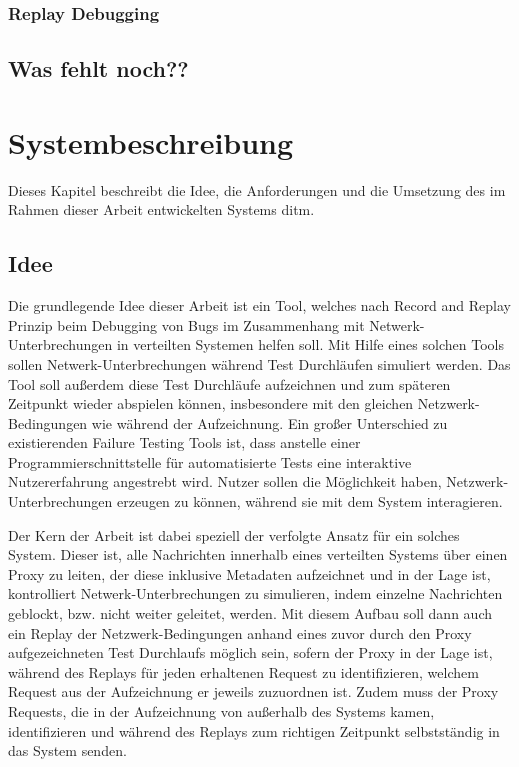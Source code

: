 \documentclass[12pt,a4paper]{report}
\begin{document}
\subsection{Replay Debugging}
\cite{distributed_replay_debugging_1997}
\cite{failify_masters_thesis}

\section{Was fehlt noch??}

\chapter{Systembeschreibung}
Dieses Kapitel beschreibt die Idee, die Anforderungen und die Umsetzung des im Rahmen dieser Arbeit entwickelten Systems ditm.
\section{Idee}
Die grundlegende Idee dieser Arbeit ist ein Tool, welches nach Record and Replay Prinzip beim Debugging von Bugs im Zusammenhang
mit Netwerk-Unterbrechungen in verteilten Systemen helfen soll. Mit Hilfe eines solchen Tools sollen Netwerk-Unterbrechungen
während Test Durchläufen simuliert werden. Das Tool soll außerdem diese Test Durchläufe aufzeichnen und zum späteren Zeitpunkt
wieder abspielen können, insbesondere mit den gleichen Netzwerk-Bedingungen wie während der Aufzeichnung. Ein großer Unterschied
zu existierenden Failure Testing Tools ist, dass anstelle einer Programmierschnittstelle für automatisierte Tests eine interaktive
Nutzererfahrung angestrebt wird. Nutzer sollen die Möglichkeit haben, Netzwerk-Unterbrechungen erzeugen zu können, während sie mit
dem System interagieren.

Der Kern der Arbeit ist dabei speziell der verfolgte Ansatz für ein solches System. Dieser ist, alle Nachrichten innerhalb eines
verteilten Systems über einen Proxy zu leiten, der diese inklusive Metadaten aufzeichnet und in der Lage ist, kontrolliert
Netwerk-Unterbrechungen zu simulieren, indem einzelne Nachrichten geblockt, bzw. nicht weiter geleitet, werden.
Mit diesem Aufbau soll dann auch ein Replay der Netzwerk-Bedingungen anhand eines zuvor durch den Proxy aufgezeichneten
Test Durchlaufs möglich sein, sofern der Proxy in der Lage ist, während des Replays für jeden erhaltenen Request zu identifizieren,
welchem Request aus der Aufzeichnung er jeweils zuzuordnen ist. Zudem muss der Proxy Requests, die in der Aufzeichnung von
außerhalb des Systems kamen, identifizieren und während des Replays zum richtigen Zeitpunkt selbstständig in das System senden.
\end{document}
